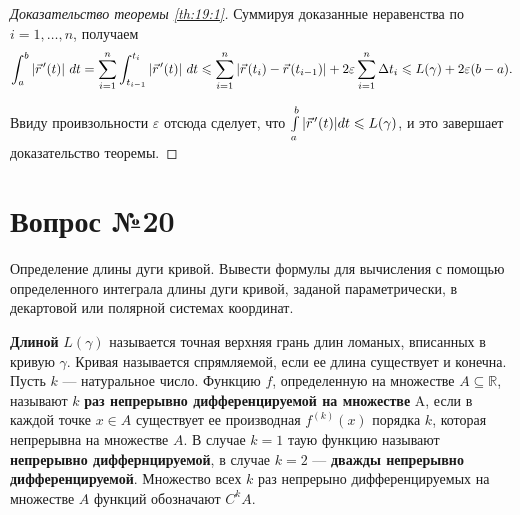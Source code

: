 \documentclass[12pt]{report}
\numberwithin{equation}{section}
\newcommand{\pvec}[1]{\vec{#1}\mkern2mu\vphantom{#1}}
\begin{document}
\begin{proof} [Доказательство теоремы \ref{th:19:1}]
Суммируя доказанные неравенства по $i = 1, \ldots, n$, получаем
\[\int_a^b |\pvec{r}' (t)| ~dt = \sum_{i=1}^n \int_{t_{i-1}}^{t_i} |\pvec{r}'(t)| ~dt \leqslant \sum_{i=1}^n |\pvec{r}(t_i) - \pvec{r}(t_{i-1}) | + 2 \varepsilon \sum_{i=1}^n \Delta t_i \leqslant L(\gamma) + 2 \varepsilon (b-a).\]

Ввиду проивзольности $\varepsilon$ отсюда сделует, что $\int\limits_a^b |\pvec{r}'(t)|dt \leqslant L(\gamma)$, и это завершает доказательство теоремы.
\end{proof}

\newpage \section{Вопрос №20} %
\begin{framed}
Определение длины дуги кривой. Вывести формулы для вычисления с помощью определенного интеграла длины дуги кривой, заданой параметрически, в декартовой или полярной системах координат.
\end{framed}

\textbf{Длиной} $L(\gamma)$ называется точная верхняя грань длин ломаных, вписанных в кривую $\gamma$. Кривая называется спрямляемой, если ее длина существует и конечна.\\

Пусть $k$ --- натуральное число. Функцию $f$, определенную на множестве  $A \subseteq \mathbb{R}$, называют $k$ \textbf{раз непрерывно дифференцируемой на множестве} A, если в каждой точке $x \in A$ существует ее производная $f^{(k)} (x)$ порядка $k$, которая непрерывна на множестве $A$. В случае $k = 1$ таую функцию называют \textbf{непрерывно диффернцируемой}, в случае $k = 2$ --- \textbf{дважды непрерывно дифференцируемой}. Множество всех $k$ раз непрерыно дифференцируемых на множестве $A$ функций обозначают $C^k A$.
\end{document}
